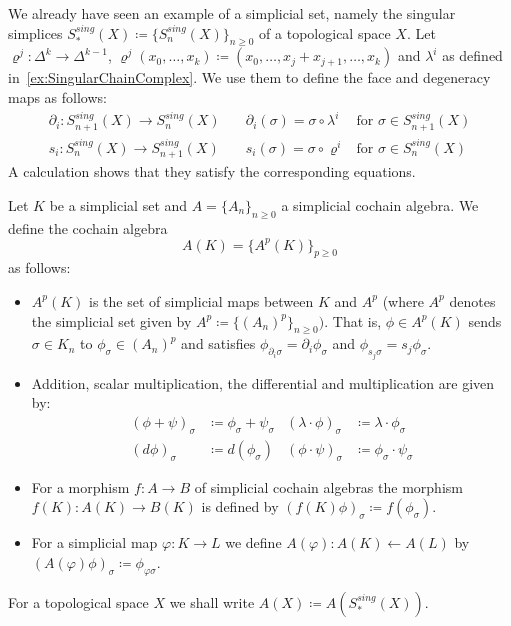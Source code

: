  \begin{Example}
\label{ex:SingularSimplicesAreSimplicialSets}
    We already have seen an example of a simplicial set, namely the singular simplices 
    $S^{sing}_*(X) \coloneqq {\lbrace S_n^{sing}(X) \rbrace}_{n \geq 0}$ of a topological space $X$.
    Let
    $\varrho^j \colon \Delta^k \to \Delta^{k - 1}$,
    $\varrho^j(x_0, \dotsc , x_k) \coloneqq (x_0 , \dotsc, x_j + x_{j + 1} , \dotsc, x_k)$ and 
    $\lambda^i$ as defined in~\ref{ex:SingularChainComplex}. We use them to define the face
    and degeneracy maps as follows:
    \begin{align*}
     \partial_i \colon S_{n+1}^{sing}(X) \to S_n^{sing}(X) \quad	 &	 \partial_i(\sigma) =
      \sigma \circ \lambda^i  & \text{for $\sigma \in S_{n+1}^{sing}(X)$} 	\\
     s_i \colon S_n^{sing}(X) \to S_{n+1}^{sing}(X) \quad	&	s_i( \sigma) =
     \sigma \circ \varrho^i  & \text{for $\sigma \in S_{n}^{sing}(X)$}
    \end{align*}
    A calculation shows that they satisfy the corresponding equations.
 \end{Example}

 \begin{Definition}
  Let $K$ be a simplicial set and $A = { \lbrace A_n \rbrace}_{n \geq 0}$ a simplicial cochain algebra. We define the cochain algebra
  $$ A(K) = { \lbrace A^p(K) \rbrace}_{ p \geq 0} $$
  as follows:
  \begin{itemize}
   \item $A^p(K)$ is the set of simplicial maps between $K$ and $A^p$ 
   (where $A^p$ denotes the simplicial set given by $A^p \coloneqq {\lbrace (A_n)^p \rbrace}_{n \geq 0})$. That is,
   $\phi \in A^p(K)$ sends $\sigma \in K_n$ to $\phi_{\sigma} \in {(A_n)}^p$ and satisfies 
   $\phi_{ \partial_i \sigma} = \partial_i \phi_{\sigma}$ and $\phi_{ s_j \sigma} = s_j \phi_{\sigma}$.
   
   \item Addition, scalar multiplication, the differential and multiplication are given by:
   \begin{align*}
    (\phi + \psi)_{\sigma} &\coloneqq \phi_{\sigma} + \psi_{\sigma} & 
    (\lambda \cdot \phi)_{\sigma} &\coloneqq \lambda \cdot \phi_{\sigma} \\
    (d \phi)_{\sigma} &\coloneqq d( \phi_{\sigma}) &  
    {(\phi \cdot \psi)}_{\sigma} &\coloneqq \phi_{\sigma}  \cdot \psi_{\sigma}
   \end{align*}
  
    \item For a morphism $f \colon A \to B$ \; of simplicial cochain algebras the morphism
      $f(K) \colon A(K) \to B(K)$ is defined by $(f(K) \phi)_{\sigma} \coloneqq f(\phi_{\sigma})$.
    
    \item For a simplicial map $\varphi \colon K \to L$ we define ${A(\varphi) \colon A(K) \gets A(L)}$
      by $(A(\varphi) \phi)_{\sigma} \coloneqq \phi_{\varphi \sigma}$.
  \end{itemize}
  For a topological space $X$ we shall write $A(X) \coloneqq A(S_*^{sing}(X))$.
 \end{Definition}

